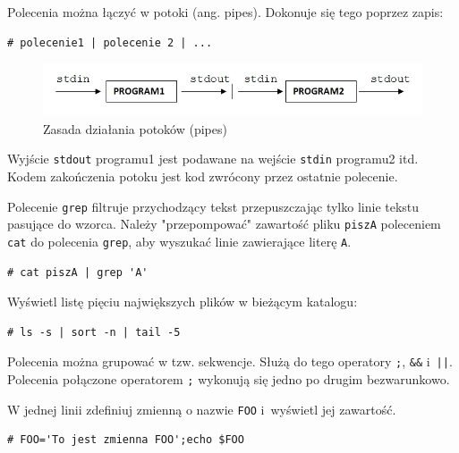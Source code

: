 \begin{example} 
Polecenia można łączyć w potoki (ang. pipes). Dokonuje się tego poprzez zapis:
 
\begin{lstlisting}[style=MyBashStyle] 
# polecenie1 | polecenie 2 | ...
\end{lstlisting}

\begin{figure}[!h]
\centering
\includegraphics[width=1.0\textwidth]{img/potoki}
\caption{Zasada działania potoków (pipes)}
\label{fig:potoki}
\end{figure}

Wyjście \lstinline[style=MyBashStyle]{stdout} programu1 jest podawane na wejście \lstinline[style=MyBashStyle]{stdin} programu2 itd. Kodem zakończenia potoku jest kod zwrócony przez ostatnie polecenie.

Polecenie \lstinline[style=MyBashStyle]{grep} filtruje przychodzący tekst przepuszczając tylko linie tekstu pasujące do wzorca. Należy "przepompować" zawartość pliku \lstinline[style=MyBashStyle]{piszA} poleceniem \lstinline[style=MyBashStyle]{cat} do polecenia \lstinline[style=MyBashStyle]{grep}, aby wyszukać linie zawierające literę \lstinline[style=MyBashStyle]{A}.

\begin{lstlisting}[style=MyBashStyle] 
# cat piszA | grep 'A'
\end{lstlisting}

\end{example} 

\begin{example} 

Wyświetl listę pięciu największych plików w bieżącym katalogu: 

\begin{lstlisting}[style=MyBashStyle] 
# ls -s | sort -n | tail -5
\end{lstlisting}
\end{example} 

\begin{example} 

Polecenia można grupować w tzw. sekwencje. Służą do tego operatory \lstinline[style=MyBashStyle]{;}, \lstinline[style=MyBashStyle]{&&} i~\lstinline[style=MyBashStyle]{||}. Polecenia połączone operatorem \lstinline[style=MyBashStyle]{;} wykonują się jedno po drugim bezwarunkowo. 

W jednej linii zdefiniuj zmienną o nazwie \lstinline[style=MyBashStyle]{FOO} i~wyświetl jej zawartość.

\begin{lstlisting}[style=MyBashStyle] 
# FOO='To jest zmienna FOO';echo $FOO
\end{lstlisting}

\end{example}


